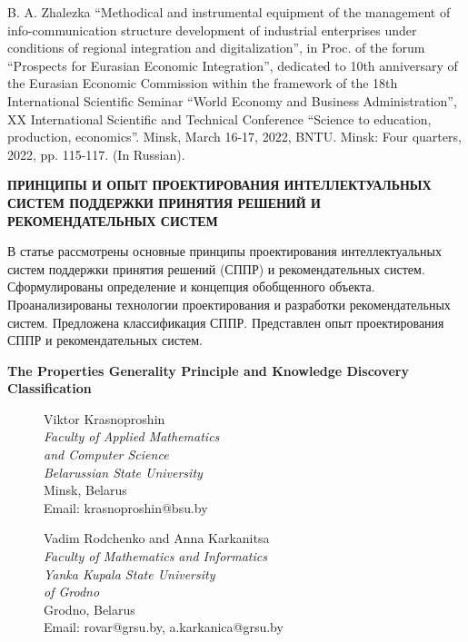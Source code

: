 \documentclass[10pt, a4paper]{article}
\begin{document}
\begin{multicols}{2}
\begin{enumerate}[label={[\arabic*]}]
    B. A. Zhalezka “Methodical and instrumental equipment of the management
of info-communication structure development of industrial enterprises under
conditions of regional integration and digitalization”, in Proc. of the
forum “Prospects for Eurasian Economic Integration”, dedicated to 10th
anniversary of the Eurasian Economic Commission within the framework of
the 18th International Scientific Seminar “World Economy and Business
Administration”, XX International Scientific and Technical Conference
“Science to education, production, economics”. Minsk, March 16-17, 2022,
BNTU. Minsk: Four quarters, 2022, pp. 115-117. (In Russian).
\end{enumerate}

\begin{center}

\caption{\textbf{ПРИНЦИПЫ И ОПЫТ ПРОЕКТИРОВАНИЯ
ИНТЕЛЛЕКТУАЛЬНЫХ СИСТЕМ
ПОДДЕРЖКИ ПРИНЯТИЯ РЕШЕНИЙ И
РЕКОМЕНДАТЕЛЬНЫХ СИСТЕМ}
}
\subtitle{Железко Б. А., Синявская О. А.
} %
\end{center}
В статье рассмотрены основные принципы проектирования интеллектуальных систем поддержки принятия решений
(СППР) и рекомендательных систем. Сформулированы определение и концепция обобщенного объекта. Проанализированы технологии проектирования и разработки рекомендательных систем. Предложена классификация СППР. Представлен опыт проектирования СППР и рекомендательных
систем.

\newpage
\end{multicols}
\begin{center}

\caption{\textbf{\Huge{The Properties Generality Principle and
Knowledge Discovery Classification}}
}
\end{center}
\vspace{0.4cm}
\begin{figure}[H]
\begin{minipage}{7cm}
\centering
    Viktor Krasnoproshin \\
\textit{Faculty of Applied Mathematics\\
and Computer Science 
\\ Belarussian State University } \\
Minsk, Belarus \\
Email: krasnoproshin@bsu.by
\end{minipage}
\begin{minipage}{9cm}
\centering
   Vadim Rodchenko and Anna Karkanitsa \\
\textit{Faculty of Mathematics and Informatics\\
Yanka Kupala State University 
\\ of Grodno} \\
Grodno, Belarus \\
Email: rovar@grsu.by, a.karkanica@grsu.by \\
\end{minipage}
\end{figure}
 \par
\end{document}
